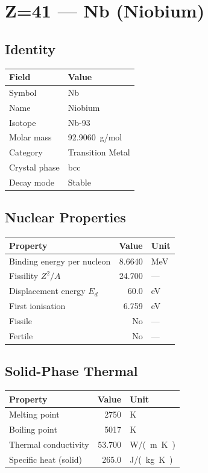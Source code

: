 \documentclass[11pt,a4paper]{article}
\begin{document}
\newpage

\section{Z=41 --- Nb (Niobium)}
\label{sec:Z41}

\subsection{Identity}
\begin{tabular}{ll}
  \toprule
  Field & Value \\
  \midrule
  Symbol & Nb \\
  Name & Niobium \\
  Isotope & Nb-93 \\
  Molar mass & \SI{92.9060}{g/mol} \\
  Category & Transition Metal \\
  Crystal phase & bcc \\
  Decay mode & Stable \\
  \bottomrule
\end{tabular}

\subsection{Nuclear Properties}
\begin{tabular}{lrl}
  \toprule
  Property & Value & Unit \\
  \midrule
  Binding energy per nucleon & 8.6640 & \si{MeV} \\
  Fissility $Z^2/A$ & 24.700 & --- \\
  Displacement energy $E_d$ & 60.0 & \si{eV} \\
  First ionisation & 6.759 & \si{eV} \\
  Fissile & No & --- \\
  Fertile & No & --- \\
  \bottomrule
\end{tabular}

\subsection{Solid-Phase Thermal}
\begin{tabular}{lrl}
  \toprule
  Property & Value & Unit \\
  \midrule
  Melting point & 2750 & \si{K} \\
  Boiling point & 5017 & \si{K} \\
  Thermal conductivity & 53.700 & \si{W/(m.K)} \\
  Specific heat (solid) & 265.0 & \si{J/(kg.K)} \\
  \bottomrule
\end{tabular}
\end{document}
